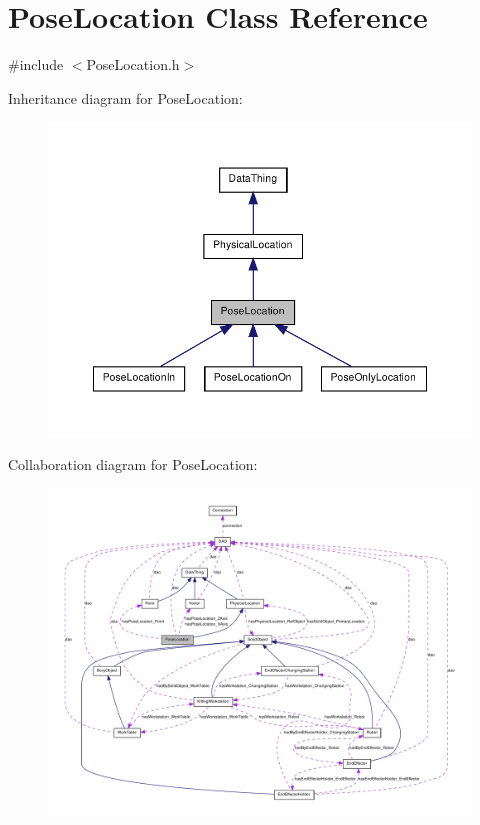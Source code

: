 \hypertarget{class_pose_location}{
\section{PoseLocation Class Reference}
\label{class_pose_location}
}


{\ttfamily \#include $<$PoseLocation.h$>$}



Inheritance diagram for PoseLocation:\nopagebreak
\begin{figure}[H]
\begin{center}
\leavevmode
\includegraphics[width=372pt]{class_pose_location__inherit__graph}
\end{center}
\end{figure}


Collaboration diagram for PoseLocation:\nopagebreak
\begin{figure}[H]
\begin{center}
\leavevmode
\includegraphics[width=400pt]{class_pose_location__coll__graph}
\end{center}
\end{figure}
